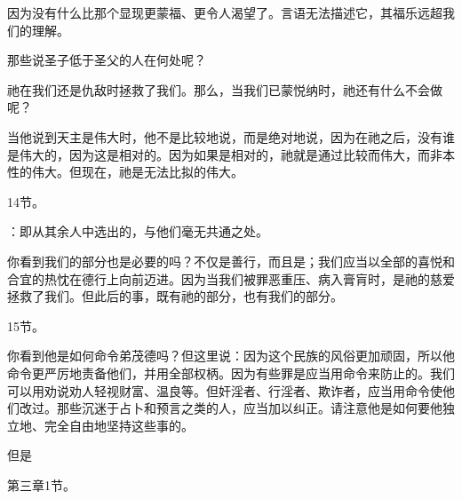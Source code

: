 因为没有什么比那个显现更蒙福、更令人渴望了。言语无法描述它，其福乐远超我们的理解。\par

\par

那些说圣子低于圣父的人在何处呢？\par

祂在我们还是仇敌时拯救了我们。那么，当我们已蒙悦纳时，祂还有什么不会做呢？\par

当他说到天主是伟大时，他不是比较地说，而是绝对地说，因为在祂之后，没有谁是伟大的，因为这是相对的。因为如果是相对的，祂就是通过比较而伟大，而非本性的伟大。但现在，祂是无法比拟的伟大。\par

14节。 \par

：即从其余人中选出的，与他们毫无共通之处。\par

\par

你看到我们的部分也是必要的吗？不仅是善行，而且是；我们应当以全部的喜悦和合宜的热忱在德行上向前迈进。因为当我们被罪恶重压、病入膏肓时，是祂的慈爱拯救了我们。但此后的事，既有祂的部分，也有我们的部分。\par

15节。 \par

你看到他是如何命令弟茂德吗？但这里说：因为这个民族的风俗更加顽固，所以他命令更严厉地责备他们，并用全部权柄。因为有些罪是应当用命令来防止的。我们可以用劝说劝人轻视财富、温良等。但奸淫者、行淫者、欺诈者，应当用命令使他们改过。那些沉迷于占卜和预言之类的人，应当加以纠正。请注意他是如何要他独立地、完全自由地坚持这些事的。\par

但是\par

第三章1节。 \par

